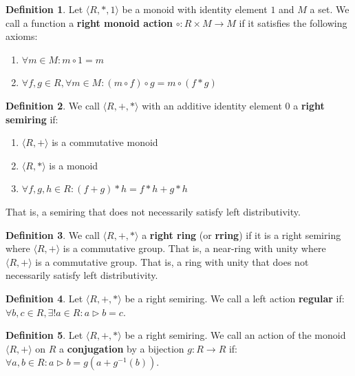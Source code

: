 \documentclass[12pt]{article}
\theoremstyle{definition}
\newtheorem{definition}{Definition}[section]
\begin{document}
\begin{definition}
Let $\langle R, *, 1 \rangle$ be a monoid with identity element $1$ and $M$ a set. 
We call a function a \textbf{right monoid action} $\circ : R \times M \to M$ if it satisfies the following axioms:


\begin{enumerate}
\item $\forall m \in M:  m \circ 1 = m$
\item $\forall f, g \in R, \forall m \in M: (m \circ f) \circ g = m \circ (f * g)$
\end{enumerate}
\end{definition}



\begin{definition} We call $\langle R, +, * \rangle$ with an additive identity element $0$ a \textbf{right semiring} if:

\begin{enumerate}
\item $\langle R, + \rangle$ is a commutative monoid
\item $\langle R, * \rangle$ is a monoid  
\item $\forall f, g, h \in R: (f + g) * h = f * h + g * h$ 
\end{enumerate}

That is, a semiring that does not necessarily satisfy left distributivity.
\end{definition}

\vspace{5pt}
\begin{definition} We call $\langle R, +, * \rangle$ a \textbf{right ring} (or \textbf{rring}) if it is a right semiring where $\langle R, + \rangle$ is a commutative group.  
That is, a near-ring with unity where $\langle R, + \rangle$ is a commutative group.  
That is, a ring with unity that does not necessarily satisfy left distributivity.
\end{definition}


\vspace{5pt}
\begin{definition} Let $\langle R, +, * \rangle$ be a right semiring. We call a left action \textbf{regular} if:
$\forall b, c \in R, \exists! a \in R: a \triangleright b = c$.
\end{definition}

\vspace{5pt}
\begin{definition} Let $\langle R, +, * \rangle$ be a right semiring. We call an action of the monoid $\langle R, + \rangle$ on $R$ a \textbf{conjugation} by a bijection $g: R \to R$ if:
$\forall a, b \in R: a \triangleright b = g(a + g^{-1}(b))$.
\end{definition}
\end{document}
